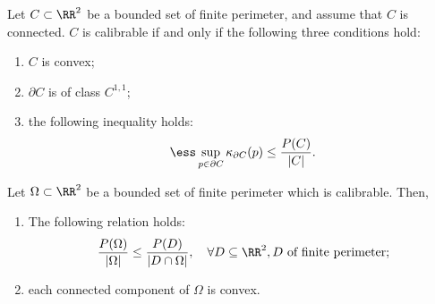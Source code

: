 \begin{prop}
Let $C\subset \RR^2$ be a bounded set of finite perimeter, and assume that $C$ is connected. $C$ is calibrable if and only if the following three conditions hold:
\begin{enumerate}
  \item $C$ is convex;
  \item $\partial C$ is of class $C^{1,1}$;
  \item the following inequality holds:
    \begin{align}
      \ess \sup_{p\in \partial C} \kappa_{\partial C} (p)\leq \frac{P(C)}{|C|}.
    \end{align}
\end{enumerate}
\end{prop}
\begin{prop}
Let $\Omega \subset \RR^2$ be a bounded set of finite perimeter which is calibrable. Then,
\begin{enumerate}
  \item The following relation holds:
    \begin{align}
      \frac{P(\Omega)}{|\Omega|} \leq \frac{P(D)}{|D\cap \Omega|}, \quad \forall D\subseteq \RR^2, D \mbox{ of finite perimeter;}
    \end{align}
  \item each connected component of $\Omega$ is convex.
\end{enumerate}
\end{prop}
